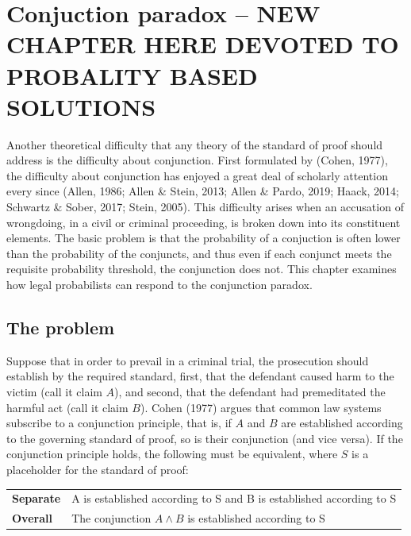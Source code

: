 \documentclass[10pt,dvipsnames,enabledeprecatedfontcommands]{scrartcl}
\newcommand{\et}{\wedge}
\begin{document}
\hypertarget{conjuction-paradox-new-chapter-here-devoted-to-probality-based-solutions}{%
\section{Conjuction paradox -- NEW CHAPTER HERE DEVOTED TO PROBALITY
BASED
SOLUTIONS}\label{conjuction-paradox-new-chapter-here-devoted-to-probality-based-solutions}}

Another theoretical difficulty that any theory of the standard of proof
should address is the difficulty about conjunction. First formulated by
(Cohen, 1977), the difficulty about conjunction has enjoyed a great deal
of scholarly attention every since (Allen, 1986; Allen \& Stein, 2013;
Allen \& Pardo, 2019; Haack, 2014; Schwartz \& Sober, 2017; Stein,
2005). This difficulty arises when an accusation of wrongdoing, in a
civil or criminal proceeding, is broken down into its constituent
elements. The basic problem is that the probability of a conjuction is
often lower than the probability of the conjuncts, and thus even if each
conjunct meets the requisite probability threshold, the conjunction does
not. This chapter examines how legal probabilists can respond to the
conjunction paradox.

\hypertarget{the-problem}{%
\subsection{The problem}\label{the-problem}}

Suppose that in order to prevail in a criminal trial, the prosecution
should establish by the required standard, first, that the defendant
caused harm to the victim (call it claim \(A\)), and second, that the
defendant had premeditated the harmful act (call it claim \(B\)). Cohen
(1977) argues that common law systems subscribe to a conjunction
principle, that is, if \(A\) and \(B\) are established according to the
governing standard of proof, so is their conjunction (and vice versa).
If the conjunction principle holds, the following must be equivalent,
where \(S\) is a placeholder for the standard of proof:

\begin{center}
\begin{tabular}
{@{}ll@{}}
\toprule
\textbf{Separate} &   A is established according to S and B is established according to S\\   
\textbf{Overall}  &   The conjunction $A \et B$ is established according to S  \\ 
\bottomrule
\end{tabular}
\end{center}
\end{document}
